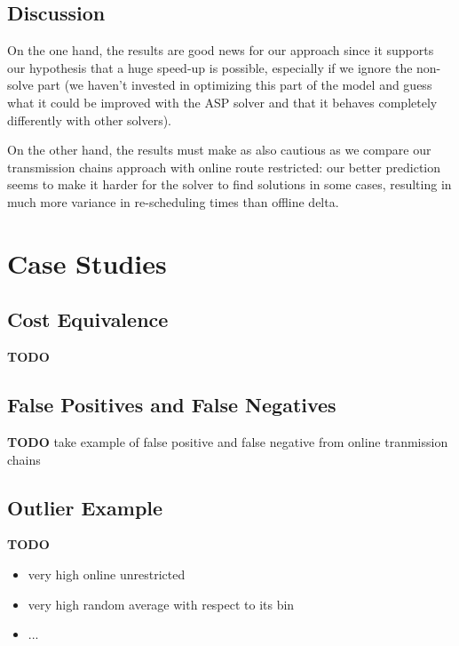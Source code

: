 \documentclass{article}
\begin{document}
\subsection{Discussion}\label{subsec:results_discussion}

On the one hand, the results are good news for our approach since it supports our hypothesis that a huge speed-up is possible, especially if we ignore the non-solve part (we haven't invested in optimizing this part of the model and guess what it could be improved with the ASP solver and that it behaves completely differently with other solvers).

On the other hand, the results must make as also cautious as we compare our  transmission chains approach with online route restricted: our better prediction seems to make it harder for the solver to find solutions in some cases, resulting in much more variance in re-scheduling times than offline delta.

\section{Case Studies}\label{sec:CaseStudies}

\subsection{Cost Equivalence}\label{subsec:cost_equivalence}
\begin{mdframed}
{\bf TODO}
\end{mdframed}


\subsection{False Positives and False Negatives}
\label{subsec:false_positives_false_negatives}
\begin{mdframed}
{\bf TODO } take example of false positive and false negative from online tranmission chains
\end{mdframed}


\subsection{Outlier Example}\label{subsec:outlier}
\begin{mdframed}
{\bf TODO}
\begin{itemize}
    \item very high online unrestricted
    \item very high random average with respect to its bin
    \item ...
\end{itemize}
\end{mdframed}
\end{document}
